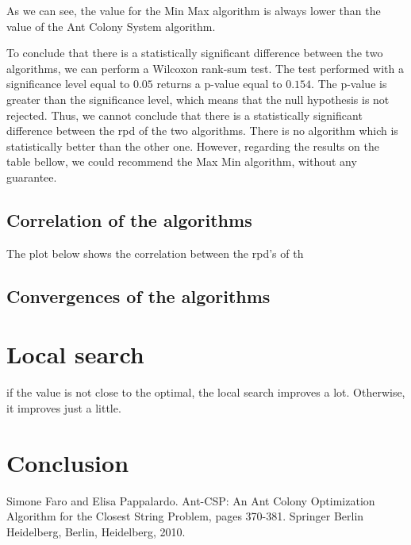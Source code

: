 \documentclass{article}
\begin{document}
As we can see, the value for the Min Max algorithm is always lower than the value of the Ant Colony System algorithm. \newline

To conclude that there is a statistically significant difference between the two algorithms, we can perform a Wilcoxon rank-sum test.
The test performed with a significance level equal to $0.05$ returns a p-value equal to $0.154$.
The p-value is greater than the significance level, which means that the null hypothesis is not rejected.
Thus, we cannot conclude that there is a statistically significant difference between the rpd of the two algorithms.
There is no algorithm which is statistically better than the other one.
However, regarding the results on the table bellow, we could recommend the Max Min algorithm, without any guarantee.

\subsection{Correlation of the algorithms}

The plot below shows the correlation between the rpd's of th

\subsection{Convergences of the algorithms}



\section{Local search}

if the value is not close to the optimal, the local search improves a lot.
Otherwise, it improves just a little.


\section*{Conclusion}

\begin{thebibliography}{2}

 Simone Faro and Elisa Pappalardo.
Ant-CSP: An Ant Colony Optimization Algorithm for the Closest String Problem, pages 370-381.
Springer Berlin
Heidelberg, Berlin, Heidelberg, 2010.

\end{thebibliography}
\end{document}
